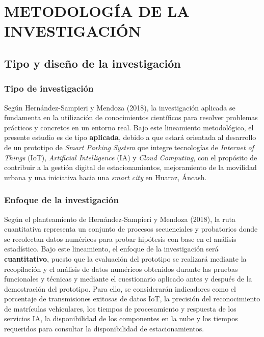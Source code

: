 \documentclass[12pt,a4paper]{article}
\begin{document}
\clearpage
\section{METODOLOGÍA DE LA INVESTIGACIÓN}

\subsection{Tipo y diseño de la investigación}

\subsubsection{Tipo de investigación}
Según Hernández-Sampieri y Mendoza (2018), la investigación aplicada se fundamenta en la utilización de conocimientos científicos para resolver problemas prácticos y concretos en un entorno real. Bajo este lineamiento metodológico, el presente estudio es de tipo \textbf{aplicada}, debido a que estará orientada al desarrollo de un prototipo de \textit{Smart Parking System} que integre tecnologías de \textit{Internet of Things} (IoT), \textit{Artificial Intelligence} (IA) y \textit{Cloud Computing}, con el propósito de contribuir a la gestión digital de estacionamientos, mejoramiento de la movilidad urbana y una iniciativa hacia una \textit{smart city} en Huaraz, Áncash.

\subsubsection{Enfoque de la investigación}
Según el planteamiento de Hernández-Sampieri y Mendoza (2018), la ruta cuantitativa representa un conjunto de procesos secuenciales y probatorios donde se recolectan datos numéricos para probar hipótesis con base en el análisis estadístico. Bajo este lineamiento, el enfoque de la investigación será \textbf{cuantitativo}, puesto que la evaluación del prototipo se realizará mediante la recopilación y el análisis de datos numéricos obtenidos durante las pruebas funcionales y técnicas y mediante el cuestionario aplicado antes y después de la demostración del prototipo. Para ello, se considerarán indicadores como el porcentaje de transmisiones exitosas de datos IoT, la precisión del reconocimiento de matrículas vehiculares, los tiempos de procesamiento y respuesta de los servicios IA, la disponibilidad de los componentes en la nube y los tiempos requeridos para consultar la disponibilidad de estacionamientos.
\end{document}
